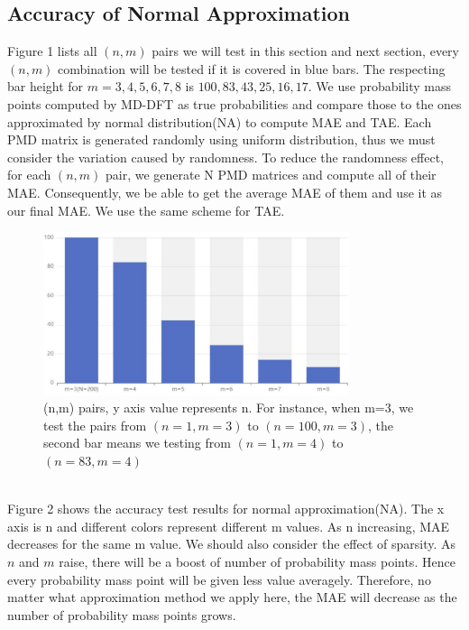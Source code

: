 \documentclass[12pt]{article}
\begin{document}
\subsection{Accuracy of Normal Approximation}
Figure 1 lists all $(n,m)$ pairs we will test in this section and next section, every $(n,m)$ combination will be tested if it is covered in blue bars. The respecting bar height for $m=3,4,5,6,7,8$ is $100,83,43,25,16,17$. We use probability mass points computed by MD-DFT as true probabilities and compare those to the ones approximated by normal distribution(NA) to compute MAE and  TAE. Each PMD matrix is generated randomly using uniform distribution, thus we must consider the variation caused by randomness. To reduce the randomness effect, for each $(n,m)$ pair, we generate N PMD matrices and compute all of their MAE. Consequently, we be able to get the average MAE of them and use it as our final MAE. We use the same scheme for TAE.
\begin{figure}%
    \centering
    \includegraphics[width=0.8\textwidth]{nm_pairs.pdf}
    \caption{(n,m) pairs, y axis value represents n. For instance, when m=3, we test the pairs from $(n=1,m=3)$ to $(n=100,m=3)$, the second bar means we testing from $(n=1,m=4)$ to $(n=83,m=4)$}
\end{figure}\\
Figure 2 shows the accuracy test results for normal approximation(NA). The x axis is n and different colors represent different m values. As n increasing, MAE decreases for the same m value. We should also consider the effect of sparsity. As $n$ and $m$ raise, there will be a boost of number of probability mass points. Hence every probability mass point will be given less value averagely. Therefore, no matter what approximation method we apply here, the MAE will decrease as the number of probability mass points grows.
\end{document}
